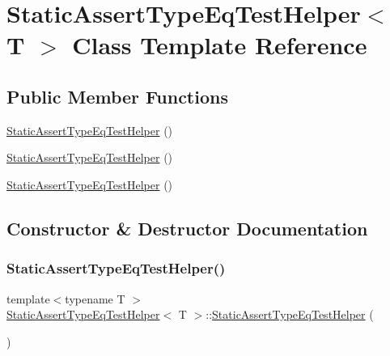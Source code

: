 \hypertarget{class_static_assert_type_eq_test_helper}{}\section{Static\+Assert\+Type\+Eq\+Test\+Helper$<$ T $>$ Class Template Reference}
\label{class_static_assert_type_eq_test_helper}
\subsection*{Public Member Functions}
\begin{DoxyCompactItemize}
\item 
\mbox{\hyperlink{class_static_assert_type_eq_test_helper_a9b567f0542f353d536119dae01e1ee1d}{Static\+Assert\+Type\+Eq\+Test\+Helper}} ()
\item 
\mbox{\hyperlink{class_static_assert_type_eq_test_helper_a9b567f0542f353d536119dae01e1ee1d}{Static\+Assert\+Type\+Eq\+Test\+Helper}} ()
\item 
\mbox{\hyperlink{class_static_assert_type_eq_test_helper_a9b567f0542f353d536119dae01e1ee1d}{Static\+Assert\+Type\+Eq\+Test\+Helper}} ()
\end{DoxyCompactItemize}


\subsection{Constructor \& Destructor Documentation}
\mbox{\label{class_static_assert_type_eq_test_helper_a9b567f0542f353d536119dae01e1ee1d}} 
\subsubsection{\texorpdfstring{StaticAssertTypeEqTestHelper()}{StaticAssertTypeEqTestHelper()}\hspace{0.1cm}{\footnotesize\ttfamily [1/3]}}
{\footnotesize\ttfamily template$<$typename T $>$ \\
\mbox{\hyperlink{class_static_assert_type_eq_test_helper}{Static\+Assert\+Type\+Eq\+Test\+Helper}}$<$ T $>$\+::\mbox{\hyperlink{class_static_assert_type_eq_test_helper}{Static\+Assert\+Type\+Eq\+Test\+Helper}} (\begin{DoxyParamCaption}{ }\end{DoxyParamCaption})\hspace{0.3cm}{\ttfamily [inline]}}

